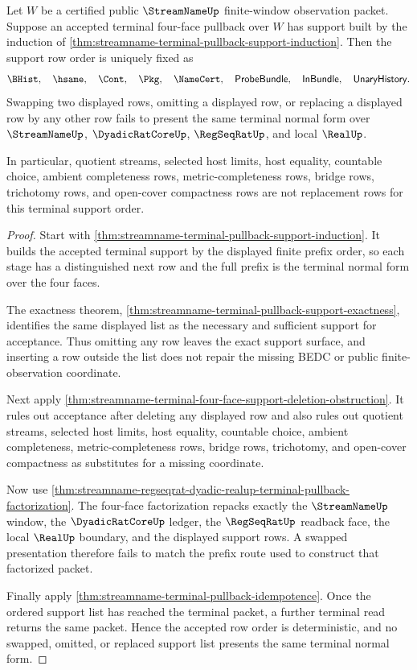 \begin{theorem}
\label{thm:streamname-terminal-pullback-row-order-determinacy}
Let $W$ be a certified public $\StreamNameUp$ finite-window observation packet.
Suppose an accepted terminal four-face pullback over $W$ has support built by
the induction of
\autoref{thm:streamname-terminal-pullback-support-induction}. Then the support
row order is uniquely fixed as
$$
\BHist,\quad \hsame,\quad \Cont,\quad \Pkg,\quad \NameCert,\quad
\mathsf{ProbeBundle},\quad \mathsf{InBundle},\quad
\mathsf{UnaryHistory}.
$$
Swapping two displayed rows, omitting a displayed row, or replacing a
displayed row by any other row fails to present the same terminal normal form
over $\StreamNameUp$, $\DyadicRatCoreUp$, $\RegSeqRatUp$, and local $\RealUp$.

In particular, quotient streams, selected host limits, host equality,
countable choice, ambient completeness rows, metric-completeness rows, bridge
rows, trichotomy rows, and open-cover compactness rows are not replacement
rows for this terminal support order.
\end{theorem}
\begin{proof}
Start with
\autoref{thm:streamname-terminal-pullback-support-induction}. It builds the
accepted terminal support by the displayed finite prefix order, so each stage
has a distinguished next row and the full prefix is the terminal normal form
over the four faces.

The exactness theorem,
\autoref{thm:streamname-terminal-pullback-support-exactness}, identifies the
same displayed list as the necessary and sufficient support for acceptance.
Thus omitting any row leaves the exact support surface, and inserting a row
outside the list does not repair the missing BEDC or public
finite-observation coordinate.

Next apply
\autoref{thm:streamname-terminal-four-face-support-deletion-obstruction}. It
rules out acceptance after deleting any displayed row and also rules out
quotient streams, selected host limits, host equality, countable choice,
ambient completeness, metric-completeness rows, bridge rows, trichotomy, and
open-cover compactness as substitutes for a missing coordinate.

Now use
\autoref{thm:streamname-regseqrat-dyadic-realup-terminal-pullback-factorization}.
The four-face factorization repacks exactly the $\StreamNameUp$ window, the
$\DyadicRatCoreUp$ ledger, the $\RegSeqRatUp$ readback face, the local
$\RealUp$ boundary, and the displayed support rows. A swapped presentation
therefore fails to match the prefix route used to construct that factorized
packet.

Finally apply \autoref{thm:streamname-terminal-pullback-idempotence}. Once the
ordered support list has reached the terminal packet, a further terminal read
returns the same packet. Hence the accepted row order is deterministic, and no
swapped, omitted, or replaced support list presents the same terminal normal
form.
\end{proof}

